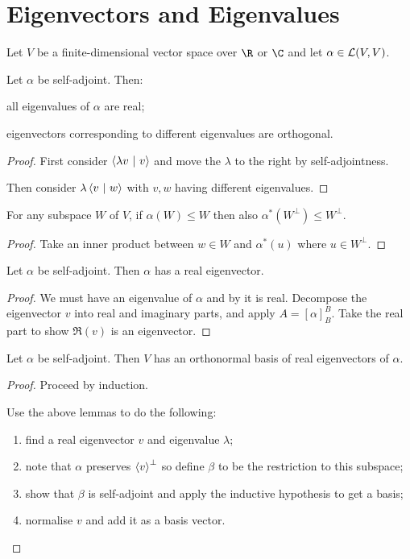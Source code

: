\documentclass[../Main.tex]{subfiles}
\begin{document}
\section{Eigenvectors and Eigenvalues}
Let $V$ be a finite-dimensional vector space over $\R$ or $\C$ and let $\alpha \in \mathcal{L}(V, V)$.
\begin{propositions}{
        Let $\alpha$ be self-adjoint. Then:
        \label{propsSelfAdjEVecEVal}
    }
    \item all eigenvalues of $\alpha$ are real; \label{propSelfAdjRealEVals}
    \item eigenvectors corresponding to different eigenvalues are orthogonal. \label{propSelfAdjEVecOrtho}
\end{propositions}
\begin{proof}
    First consider $\left\langle \lambda v~\vert~v\right\rangle$ and move the $\lambda$ to the right by self-adjointness.

    Then consider $\lambda \left\langle v~\vert~w\right\rangle$ with $v, w$ having different eigenvalues.
\end{proof}
\begin{lemma}
    For any subspace $W$ of $V$, if $\alpha(W) \leq W$ then also $\alpha^*(W^\perp) \leq W^\perp$.
    \label{lemSelfAdjSubspaces}
\end{lemma}
\begin{proof}
    Take an inner product between $w \in W$ and $\alpha^*(u)$ where $u \in W^\perp$.
\end{proof}
\begin{lemma}
    Let $\alpha$ be self-adjoint. Then $\alpha$ has a real eigenvector.
    \label{lemRealEVec}
\end{lemma}
\begin{proof}
    We must have an eigenvalue of $\alpha$ and by  it is real. Decompose the eigenvector $v$ into real and imaginary parts, and apply $A = [\alpha]_B^B$. Take the real part to show $\Re(v)$ is an eigenvector.
\end{proof}
\begin{theorem}
    Let $\alpha$ be self-adjoint. Then $V$ has an orthonormal basis of real eigenvectors of $\alpha$.
    \label{thmSpectral}
\end{theorem}
\begin{proof}
    Proceed by induction.

    Use the above lemmas to do the following:
    \begin{enumerate}
        \item find a real eigenvector $v$ and eigenvalue $\lambda$;
        \item note that $\alpha$ preserves $\left\langle v \right\rangle^\perp$ so define $\beta$ to be the restriction to this subspace;
        \item show that $\beta$ is self-adjoint and apply the inductive hypothesis to get a basis;
        \item normalise $v$ and add it as a basis vector.
    \end{enumerate}
\end{proof}
\end{document}

